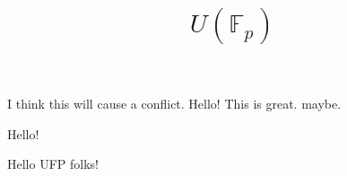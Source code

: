 \documentclass{amsart}
\begin{document}
I think this will cause a conflict. 
 Hello! This is great. maybe. 


    \title{$U(\mathbb{F}_p)$}



    \maketitle

 Hello!

 Hello UFP folks!
\end{document}

